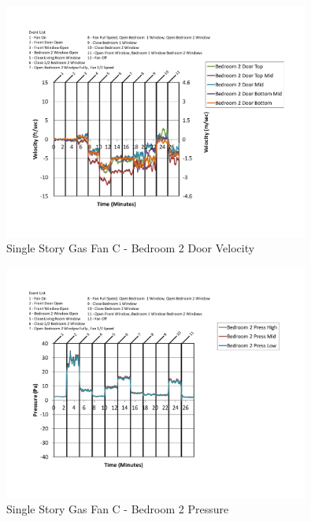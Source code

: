 \documentclass{article}
\begin{document}
\begin{appendices}
	\begin{figure}[H]
		\centering
		\includegraphics[height=3.05in,trim=0.67in 1.1in 0.67in 0.8in,clip=true]{0_Images/Results_Charts/ColdFlow/Single_Story/Gas/C/Bedroom_2_Door_Velocity.pdf}
		\caption{Single Story Gas Fan C - Bedroom 2 Door Velocity}
	\end{figure}
 

	\begin{figure}[H]
		\centering
		\includegraphics[height=3.05in,trim=0.67in 1.1in 0.67in 0.8in,clip=true]{0_Images/Results_Charts/ColdFlow/Single_Story/Gas/C/Bedroom_2_Pressure.pdf}
		\caption{Single Story Gas Fan C - Bedroom 2 Pressure}
	\end{figure}
 
	\clearpage


\end{appendices}
\end{document}
